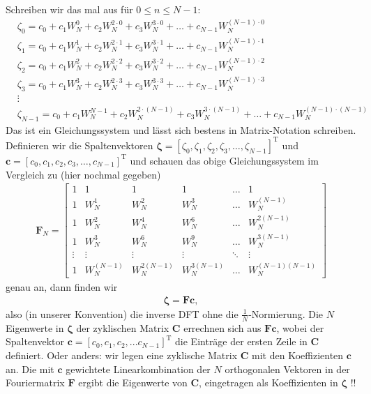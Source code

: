 Schreiben wir das mal aus für $0\leq n \leq N-1$:
\begin{align}
&\zeta_0 = c_0 + c_1 W_N^0 + c_2 W_N^{2\cdot0} + c_3 W_N^{3\cdot0} + \dots + c_{N-1} W_N^{(N-1) \cdot 0}\nonumber\\
&\zeta_1 = c_0 + c_1 W_N^1 + c_2 W_N^{2\cdot1} + c_3 W_N^{3\cdot1} + \dots + c_{N-1} W_N^{(N-1) \cdot1}\nonumber\\
&\zeta_2 = c_0 + c_1 W_N^2 + c_2 W_N^{2\cdot2} + c_3 W_N^{3\cdot2} + \dots + c_{N-1} W_N^{(N-1) \cdot2}\nonumber\\
&\zeta_3 = c_0 + c_1 W_N^3 + c_2 W_N^{2\cdot3} + c_3 W_N^{3\cdot3} + \dots + c_{N-1} W_N^{(N-1) \cdot3}\nonumber\\
&\vdots\nonumber\\
&\zeta_{N-1} = c_0 + c_1 W_N^{N-1} + c_2 W_N^{2\cdot(N-1)} + c_3 W_N^{3\cdot(N-1)} + \dots + c_{N-1} W_N^{(N-1) \cdot(N-1)}
\end{align}
Das ist ein Gleichungssystem und lässt sich bestens in Matrix-Notation schreiben.
Definieren wir die Spaltenvektoren $\bm{\zeta} = [\zeta_0, \zeta_1, \zeta_2, \zeta_3, \dots, \zeta_{N-1}]^\mathrm{T}$
und $\bm{c} = [c_0, c_1, c_2, c_3, \dots, c_{N-1}]^\mathrm{T}$ und schauen das obige
Gleichungssystem im Vergleich zu  (hier nochmal gegeben)
\begin{align*}
\bm{F}_N =
\begin{bmatrix}
1 & 1 & 1 & 1 & \dots & 1\\[1em]
1 & W_N^1 & W_N^2 & W_N^3 & \dots & W_N^{(N-1)}\\[1em]
1 & W_N^2 & W_N^4 & W_N^6 & \dots & W_N^{2(N-1)}\\[1em]
1 & W_N^3 & W_N^6 & W_N^9 & \dots & W_N^{3(N-1)}\\[1em]
\vdots & \vdots & \vdots &\vdots &\ddots & \vdots\\[1em]
1 & W_N^{(N-1)} & W_N^{2(N-1)} & W_N^{3(N-1)} & \dots & W_N^{(N-1)(N-1)}
\end{bmatrix}
\end{align*}
genau an, dann finden wir
\begin{align}
\label{eq:Zeta_F_c}
\bm{\zeta} = \bm{F} \bm{c},
\end{align}
also (in unserer Konvention) die inverse DFT ohne die $\frac{1}{N}$-Normierung.
%
Die $N$ Eigenwerte in $\bm{\zeta}$ der zyklischen Matrix $\bm{C}$ errechnen sich
aus $\bm{F} \bm{c}$, wobei der Spaltenvektor $\bm{c} = [c_0, c_1, c_2, ... c_{N-1}]^\mathrm{T}$
die Einträge der ersten Zeile in $\bm{C}$ definiert.
%
Oder anders: wir legen eine zyklische Matrix $\bm{C}$ mit den Koeffizienten
$\bm{c}$ an. Die mit $\bm{c}$ gewichtete Linearkombination
der $N$ orthogonalen Vektoren in der Fouriermatrix $\bm{F}$ ergibt die Eigenwerte
von $\bm{C}$, eingetragen als Koeffizienten in $\bm{\zeta}$ !!

